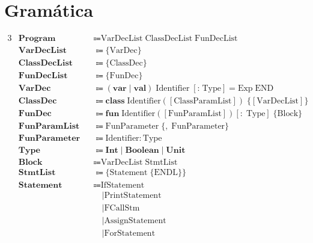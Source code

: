 \documentclass[a4paper,11pt]{article}
\begin{document}
\pagestyle{empty} %

\section*{Gramática}

\begin{alignat*}{3}
&\textbf{Program}      &&\Coloneqq  \text{VarDecList}\;\text{ClassDecList}\;\text{FunDecList} &&\\
&\textbf{VarDecList}   &&\Coloneqq  \lbrace\text{VarDec}\rbrace &&\\
&\textbf{ClassDecList} &&\Coloneqq  \lbrace\text{ClassDec}\rbrace &&\\
&\textbf{FunDecList}   &&\Coloneqq  \lbrace\text{FunDec}\rbrace &&\\
&\textbf{VarDec}       &&\Coloneqq  (\textbf{var}\mid\textbf{val})\;\text{Identifier}\;[\textbf{:}\;\text{Type}] = \text{Exp}\;\text{END} &&\\
&\textbf{ClassDec}     &&\Coloneqq  \textbf{class}\;\text{Identifier}([\text{ClassParamList}])\;\lbrace[\text{VarDecList}]\rbrace &&\\
&\textbf{FunDec}       &&\Coloneqq  \textbf{fun}\;\text{Identifier}([\text{FunParamList}])[:\;\text{Type}]\;\lbrace\text{Block}\rbrace &&\\
&\textbf{FunParamList} &&\Coloneqq  \text{FunParameter}\;\lbrace,\;\text{FunParameter}\rbrace &&\\
&\textbf{FunParameter} &&\Coloneqq  \text{Identifier}:\text{Type} &&\\
&\textbf{Type}         &&\Coloneqq  \textbf{Int}\mid\textbf{Boolean}\mid\textbf{Unit} &&\\
&\textbf{Block}        &&\Coloneqq  \text{VarDecList}\;\text{StmtList} &&\\
&\textbf{StmtList}     &&\Coloneqq  \lbrace\text{Statement}\;\lbrace \text{ENDL}\rbrace\rbrace &&\\
&\textbf{Statement}    &&\Coloneqq  \text{IfStatement} &&\\
&                       &&\quad\mid  \text{PrintStatement} &&\\
&                       &&\quad\mid  \text{FCallStm} &&\\
&                       &&\quad\mid  \text{AssignStatement} &&\\
&                       &&\quad\mid  \text{ForStatement} &&\\

\end{alignat*}
\end{document}
